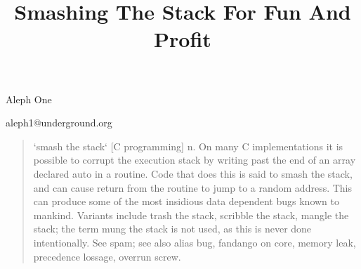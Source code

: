\documentclass[10pt]{article}
\title{Smashing The Stack For Fun And Profit}
\begin{document}
\maketitle

%

\newpage
\tableofcontents
\newpage

\begin{comment}
.oO Phrack 49 Oo.

Volume Seven, Issue Forty Nine File 14 of 16

BugTraq, r00t, and Underground.Org

 bring you

\end{comment}

\begin{center}
Aleph One

aleph1@underground.org
\end{center}
\begin{quote}

`smash the stack` [C programming] n. On many C implementations it is possible to corrupt the 
execution stack by writing past the end of an array declared auto in a routine. Code that does this is 
said to smash the stack, and can cause return from the routine to jump to a random address. This 
can produce some of the most insidious data dependent bugs known to mankind. Variants include 
trash the stack, scribble the stack, mangle the stack; the term mung the stack is not used, as this is 
never done intentionally. See spam; see also alias bug, fandango on core,  memory leak, precedence 
lossage, overrun screw.
\end{quote}
\end{document}
